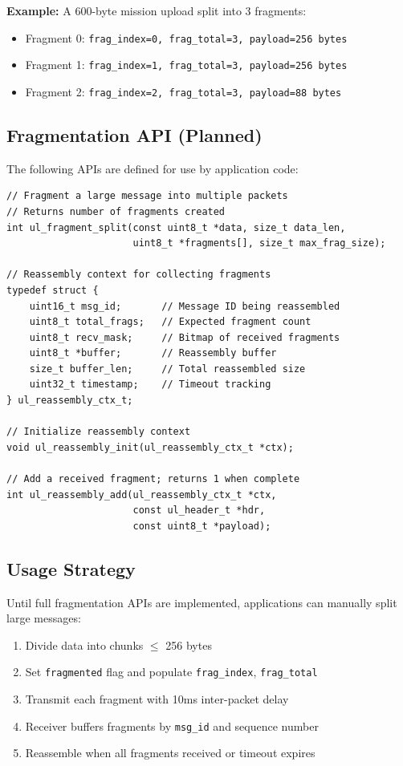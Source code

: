 \documentclass[11pt,a4paper]{article}
\begin{document}
\textbf{Example:} A 600-byte mission upload split into 3 fragments:
\begin{itemize}[noitemsep]
    \item Fragment 0: \texttt{frag\_index=0, frag\_total=3, payload=256 bytes}
    \item Fragment 1: \texttt{frag\_index=1, frag\_total=3, payload=256 bytes}
    \item Fragment 2: \texttt{frag\_index=2, frag\_total=3, payload=88 bytes}
\end{itemize}

\subsection{Fragmentation API (Planned)}

The following APIs are defined for use by application code:

\begin{lstlisting}
// Fragment a large message into multiple packets
// Returns number of fragments created
int ul_fragment_split(const uint8_t *data, size_t data_len,
                      uint8_t *fragments[], size_t max_frag_size);

// Reassembly context for collecting fragments
typedef struct {
    uint16_t msg_id;       // Message ID being reassembled
    uint8_t total_frags;   // Expected fragment count
    uint8_t recv_mask;     // Bitmap of received fragments
    uint8_t *buffer;       // Reassembly buffer
    size_t buffer_len;     // Total reassembled size
    uint32_t timestamp;    // Timeout tracking
} ul_reassembly_ctx_t;

// Initialize reassembly context
void ul_reassembly_init(ul_reassembly_ctx_t *ctx);

// Add a received fragment; returns 1 when complete
int ul_reassembly_add(ul_reassembly_ctx_t *ctx, 
                      const ul_header_t *hdr,
                      const uint8_t *payload);
\end{lstlisting}

\subsection{Usage Strategy}

Until full fragmentation APIs are implemented, applications can manually split large messages:

\begin{enumerate}[noitemsep]
    \item Divide data into chunks $\leq$ 256 bytes
    \item Set \texttt{fragmented} flag and populate \texttt{frag\_index}, \texttt{frag\_total}
    \item Transmit each fragment with 10ms inter-packet delay
    \item Receiver buffers fragments by \texttt{msg\_id} and sequence number
    \item Reassemble when all fragments received or timeout expires
\end{enumerate}
\end{document}
